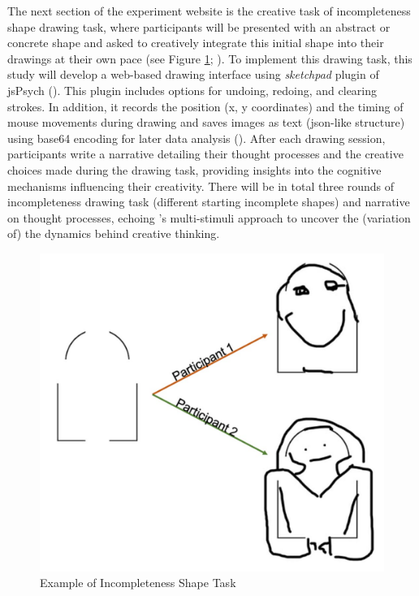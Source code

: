 \documentclass[../Proposal.tex]{subfiles}
\begin{document}
The next section of the experiment website is the creative task of incompleteness shape drawing task, where participants will be presented with an abstract or concrete shape and asked to creatively integrate this initial shape into their drawings at their own pace (see Figure \ref{fig: Example of Incompleteness Shape Task}; \cite{patterson_audra_2023}). To implement this drawing task, this study will develop a web-based drawing interface using \textit{sketchpad} plugin of jsPsych (\cite{leeuw_jspsych_2023}). This plugin includes options for undoing, redoing, and clearing strokes. In addition, it records the position (x, y coordinates) and the timing of mouse movements during drawing and saves images as text (json-like structure) using base64 encoding for later data analysis (\cite{bainbridge_tutorial_2022}). After each drawing session, participants write a narrative detailing their thought processes and the creative choices made during the drawing task, providing insights into the cognitive mechanisms influencing their creativity. There will be in total three rounds of incompleteness drawing task (different starting incomplete shapes) and narrative on thought processes, echoing \textcite{barbot_dynamics_2018}'s multi-stimuli approach to uncover the (variation of) the dynamics behind creative thinking.

\begin{figure}
    \centering
    \includegraphics[height=0.2\textheight, keepaspectratio]{screenshots/Example_Incompleteness_Shape.png}
    \caption{Example of Incompleteness Shape Task}
    \label{fig: Example of Incompleteness Shape Task}
\end{figure}
\end{document}
